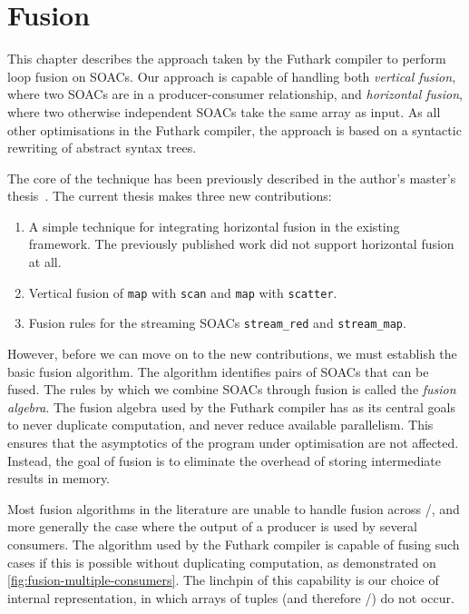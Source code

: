 \chapter{Fusion}
\label{chap:fusion}

This chapter describes the approach taken by the Futhark compiler to
perform loop fusion on SOACs.  Our approach is capable of handling
both \textit{vertical fusion}, where two SOACs are in a
producer-consumer relationship, and \textit{horizontal fusion}, where
two otherwise independent SOACs take the same array as input.  As all
other optimisations in the Futhark compiler, the approach is based on
a syntactic rewriting of abstract syntax trees.

The core of the technique has been previously described in the
author's master's thesis~\cite{henriksen2014exploiting}.  The current
thesis makes three new contributions:

\begin{enumerate}
\item A simple technique for integrating horizontal fusion in the
  existing framework.  The previously published work did not support
  horizontal fusion at all.
\item Vertical fusion of \lstinline{map} with \lstinline{scan} and
  \lstinline{map} with \lstinline{scatter}.
\item Fusion rules for the streaming SOACs \lstinline{stream_red} and
  \lstinline{stream_map}.
\end{enumerate}

However, before we can move on to the new contributions, we must
establish the basic fusion algorithm.  The algorithm identifies pairs
of SOACs that can be fused.  The rules by which we combine SOACs
through fusion is called the \textit{fusion algebra}.  The fusion
algebra used by the Futhark compiler has as its central goals to never
duplicate computation, and never reduce available parallelism.  This
ensures that the asymptotics of the program under optimisation are not
affected.  Instead, the goal of fusion is to eliminate the overhead of
storing intermediate results in memory.

Most fusion algorithms in the literature are unable to handle fusion
across /, and more generally the case where the
output of a producer is used by several consumers.  The algorithm used
by the Futhark compiler is capable of fusing such cases if this is
possible without duplicating computation, as demonstrated on
\cref{fig:fusion-multiple-consumers}.  The linchpin of this capability
is our choice of internal representation, in which arrays of tuples
(and therefore /) do not occur.


